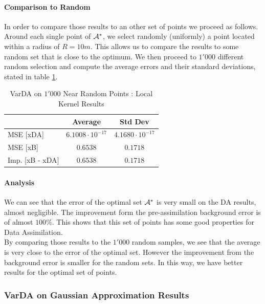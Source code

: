\paragraph{Comparison to Random}

In order to compare those results to an other set of points we proceed as follows. Around each single point of $\mathcal{A}^*$, we select randomly (uniformly) a point located within a radius of $R=10m$. This allows us to compare the results to some random set that is close to the optimum. We then proceed to $1'000$ different random selection and compute the average errors and their standard deviations, stated in table \ref{tab:varDa:random}. \\


\begin{table}[h]
\centering
\begin{tabular}{l|cc}
\toprule
               & Average & Std Dev \\ \midrule
MSE [xDA]      & $6.1008 \cdot 10^{-17}$  & $4.1680 \cdot 10^{-17}$  \\
MSE [xB]       & $0.6538$  & $0.1718$  \\
Imp. [xB - xDA]  &  $0.6538$  & $0.1718$ \\ \bottomrule
\end{tabular}
	\caption{VarDA on $1'000$ Near Random Points : Local Kernel Results}
	\label{tab:varDa:random}
\end{table}

\paragraph{Analysis}

We can see that the error of the optimal set $\mathcal{A}^*$ is very small on the DA results, almost negligible. The improvement form the pre-assimilation background error is of almost $100\%$. This shows that this set of points has some good properties for Data Assimilation. \\

By comparing those results to the $1'000$ random samples, we see that the average is very close to the error of the optimal set. However the improvement from the background error is smaller for the random sets. In this way, we have better results for the optimal set of points.  




\subsubsection{VarDA on Gaussian Approximation Results}

